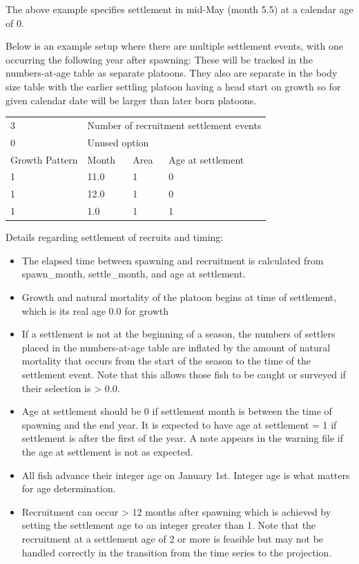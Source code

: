 The above example specifies settlement in mid-May (month 5.5) at a calendar age of 0. 

Below is an example setup where there are multiple settlement events, with one occurring the following year after spawning: These will be tracked in the numbers-at-age table as separate platoons. They also are separate in the body size table with the earlier settling platoon having a head start on growth so for given calendar date will be larger than later born platoons.

\begin{center}
	\begin{tabular}{p{3cm} p{3cm} p{2cm} p{7cm}}
		\hline
		3 & \multicolumn{3}{l}{Number of recruitment settlement events} \Tstrut\\
		0 & \multicolumn{3}{l}{Unused option} \Bstrut\\
		\hline
		Growth Pattern & Month & Area & Age at settlement \Tstrut\Bstrut\\
		\hline
		1 & 11.0 & 1 & 0 \Tstrut\\
		1 & 12.0 & 1 & 0 \\
		1 & 1.0 & 1 & 1 \Bstrut\\
		\hline
	\end{tabular}		
\end{center}

Details regarding settlement of recruits and timing:
	\begin{itemize}
		\item The  elapsed time between spawning and recruitment is calculated from spawn\_month, settle\_month, and age at settlement.
		\item Growth and natural mortality of the platoon begins at time of settlement, which is its real age 0.0 for growth
		\item If a settlement is not at the beginning of a season, the numbers of settlers placed in the numbers-at-age table are inflated by the amount of natural mortality that occurs from the start of the season to the time of the settlement event. Note that this allows those fish to be caught or surveyed if their selection is > 0.0.
		\item Age at settlement should be 0 if settlement month is between the time of spawning and the end year. It is expected to have age at settlement = 1 if settlement is after the first of the year. A note appears in the warning file if the age at settlement is not as expected.
		\item All fish advance their integer age on January 1st. Integer age is what matters for age determination.
		\item Recruitment can occur > 12 months after spawning which is achieved by setting the settlement age to an integer greater than 1. Note that the recruitment at a settlement age of 2 or more is feasible but may not be handled correctly in the transition from the time series to the projection.		
	\end{itemize}

